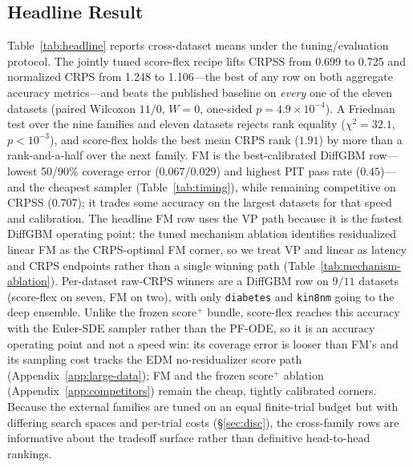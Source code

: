 \documentclass{article}
\begin{document}
\subsection{Headline Result}\label{sec:headline}
Table~\ref{tab:headline} reports cross-dataset means under the tuning/evaluation protocol. The jointly tuned score-flex recipe lifts CRPSS from 0.699 to 0.725 and normalized CRPS from 1.248 to 1.106---the best of any row on both aggregate accuracy metrics---and beats the published baseline on \emph{every} one of the eleven datasets (paired Wilcoxon $11/0$, $W{=}0$, one-sided $p=4.9\times10^{-4}$). A Friedman test over the nine families and eleven datasets rejects rank equality ($\chi^2=32.1$, $p<10^{-3}$), and score-flex holds the best mean CRPS rank ($1.91$) by more than a rank-and-a-half over the next family. FM is the best-calibrated DiffGBM row---lowest 50/90\% coverage error ($0.067$/$0.029$) and highest PIT pass rate ($0.45$)---and the cheapest sampler (Table~\ref{tab:timing}), while remaining competitive on CRPSS ($0.707$); it trades some accuracy on the largest datasets for that speed and calibration. The headline FM row uses the VP path because it is the fastest DiffGBM operating point; the tuned mechanism ablation identifies residualized linear FM as the CRPS-optimal FM corner, so we treat VP and linear as latency and CRPS endpoints rather than a single winning path (Table~\ref{tab:mechanism-ablation}). Per-dataset raw-CRPS winners are a DiffGBM row on $9/11$ datasets (score-flex on seven, FM on two), with only \texttt{diabetes} and \texttt{kin8nm} going to the deep ensemble. Unlike the frozen score$^+$ bundle, score-flex reaches this accuracy with the Euler-SDE sampler rather than the PF-ODE, so it is an accuracy operating point and not a speed win: its coverage error is looser than FM's and its sampling cost tracks the EDM no-residualizer score path (Appendix~\ref{app:large-data}); FM and the frozen score$^+$ ablation (Appendix~\ref{app:competitors}) remain the cheap, tightly calibrated corners. Because the external families are tuned on an equal finite-trial budget but with differing search spaces and per-trial costs (\S\ref{sec:disc}), the cross-family rows are informative about the tradeoff surface rather than definitive head-to-head rankings.
\end{document}
